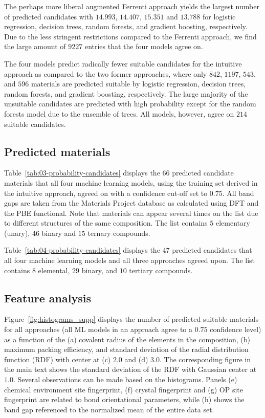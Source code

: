 \documentclass[superscriptaddress,unsortedaddress,
 amsmath,amssymb,
 aps,
]{revtex4-2}
\begin{document}
The perhaps more liberal augmented Ferrenti approach yields the largest number of predicted candidates with $14.993$, $14.407$, $15.351$ and $13.788$ for logistic regression, decision trees, random forests, and gradient boosting, respectively. Due to the less stringent restrictions compared to the Ferrenti approach, we find the large amount of $9227$ entries that the four models agree on.

The four models predict radically fewer suitable candidates for the intuitive approach as compared to the two former approaches, where only $842$, $1197$, $543$, and $596$ materials are predicted suitable by logistic regression, decision trees, random forests, and gradient boosting, respectively. The large majority of the unsuitable candidates are predicted with high probability except for the random forests model due to the ensemble of trees. All models, however, agree on $214$ suitable candidates. 

\subsection*{Predicted materials}

Table~\ref{tab:03-probability-candidates} displays the $66$ predicted candidate materials that all four machine learning models, using the training set derived in the intuitive approach, agreed on with a confidence cut-off set to $0.75$. All band gaps are taken from the Materials Project database as calculated using DFT and the PBE functional. Note that materials can appear several times  on  the  list due  to  different  structures of the same composition. The  list  contains $5$ elementary (unary), $46$  binary and  $15$ ternary compounds. 



Table~\ref{tab:04-probability-candidates} displays the $47$ predicted candidates that all four machine learning models and all three approaches agreed upon. 
The list contains $8$ elemental, $29$ binary, and $10$ tertiary compounds.



\subsection*{Feature analysis}
Figure~\ref{fig:histograms_supp} displays the number of predicted suitable materials for all approaches (all ML models in an approach agree to a $0.75$ confidence level) as a function of the (a) covalent radius of the elements in the composition, (b) maximum packing efficiency, and standard deviation of the radial distribution function (RDF) with center at (c) $2.0$ and (d) $3.0$. The corresponding figure in the main text shows the standard deviation of the RDF with Gaussian center at $1.0$. Several observations can be made based on the histograms. Panels (e) chemical environment site fingerprint, (f) crystal fingerprint and (g) OP site fingerprint are related to bond orientational parameters, while (h) shows the band gap referenced to the normalized mean of the entire data set.  
\end{document}
